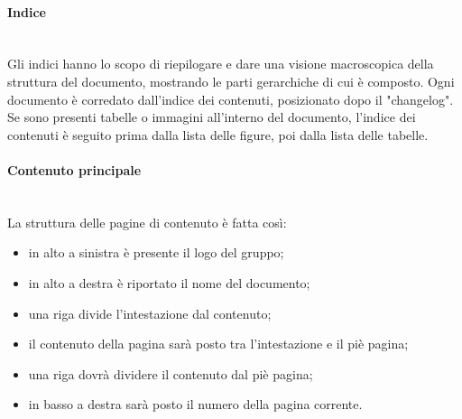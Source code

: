 		\paragraph{Indice} \mbox{}\\
		Gli indici hanno lo scopo di riepilogare e dare una visione macroscopica della struttura del documento, mostrando le parti gerarchiche di cui è composto.\newline 
		Ogni documento è corredato dall'indice dei contenuti, posizionato dopo il "changelog". Se sono presenti tabelle o immagini all'interno del documento, l'indice dei contenuti è seguito prima dalla lista delle figure, poi dalla lista delle tabelle.\newline
		\paragraph{Contenuto principale} \mbox{}\\
		La struttura delle pagine di contenuto è fatta così:
		\begin{itemize}
			\item in alto a sinistra è presente il logo del gruppo;
			\item in alto a destra è riportato il nome del documento;
			\item una riga divide l'intestazione dal contenuto;
			\item il contenuto della pagina sarà posto tra l'intestazione e il piè pagina;
			\item una riga dovrà dividere il contenuto dal piè pagina;
			\item in basso a destra sarà posto il numero della pagina corrente.
		\end{itemize}
